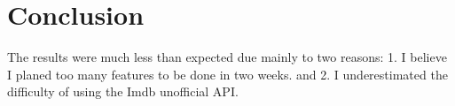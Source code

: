 \section{Conclusion}

The results were much less than expected due mainly to two reasons: 1. I
believe I planed too many features to be done in two weeks. and 2. I
underestimated the difficulty of using the Imdb unofficial API.




%
%
%
%
%


